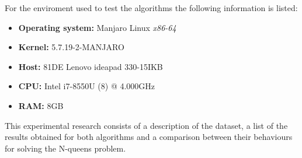 \documentclass[11pt]{llncs}
\begin{document}
For the enviroment used to test the algorithms the following information is listed:
\begin{itemize}
    \item \textbf{Operating system:} Manjaro Linux \textit{x86-64}
    \item \textbf{Kernel:} 5.7.19-2-MANJARO
    \item \textbf{Host:} 81DE Lenovo ideapad 330-15IKB
    \item \textbf{CPU:} Intel i7-8550U (8) @ 4.000GHz
    \item \textbf{RAM:} 8GB
\end{itemize}

This experimental research consists of a description of the dataset, a list of the results obtained for both algorithms and a comparison between their behaviours for solving the N-queens problem.
\end{document}
